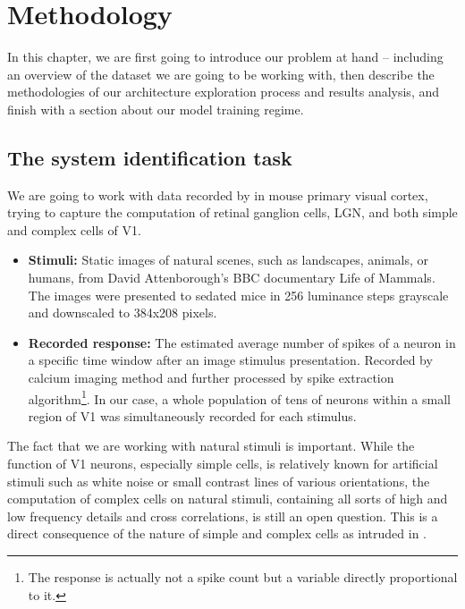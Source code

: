 \chapter{Methodology}\label{ch:4}

In this chapter, we are first going to introduce our problem at hand -- including an overview of the dataset we are going to be working with, then describe the methodologies of our architecture exploration process and results analysis, and finish with a section about our model training regime.

\section{The system identification task}

We are going to work with data recorded by \cite{antolik} in mouse primary visual cortex, trying to capture the computation of retinal ganglion cells, LGN, and both simple and complex cells of V1.

\begin{itemize}
	
	\item\textbf{Stimuli:} Static images of natural scenes, such as landscapes, animals, or humans, from David Attenborough’s BBC documentary Life of Mammals. The images were presented to sedated mice in 256 luminance steps grayscale and downscaled to 384x208 pixels.
	
	\item\textbf{Recorded response:} The estimated average number of spikes of a neuron in a specific time window after an image stimulus presentation. Recorded by calcium imaging method and further processed by spike extraction algorithm\footnote{The response is actually not a spike count but a variable directly proportional to it.}. In our case, a whole population of tens of neurons within a small region of V1 was simultaneously recorded for each stimulus.
	
\end{itemize}

The fact that we are working with natural stimuli is important. While the function of V1 neurons, especially simple cells, is relatively known for artificial stimuli such as white noise or small contrast lines of various orientations, the computation of complex cells on natural stimuli, containing all sorts of high and low frequency details and cross correlations, is still an open question. This is a direct consequence of the nature of simple and complex cells as intruded in . 

